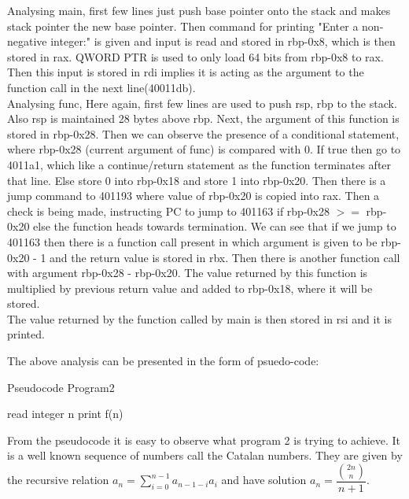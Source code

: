 \documentclass{article}
\begin{document}
Analysing main, first few lines just push base pointer onto the stack and makes stack pointer the new base pointer.
Then command for printing "Enter a non-negative integer:" is given and input is read and stored in rbp-0x8, which is then stored in rax. QWORD PTR is used to only load 64 bits from rbp-0x8 to rax. Then this input is stored in rdi implies it is acting as the argument to the function call in the next line(40011db). \\

Analysing func,
Here again, first few lines are used to push rsp, rbp to the stack. Also rsp is maintained 28 bytes above rbp. Next, the argument of this function is stored in rbp-0x28. Then we can observe the presence of a conditional statement, where rbp-0x28 (current argument of func) is compared with 0. If true then go to 4011a1, which like a continue/return statement as the function terminates after that line. Else store 0 into rbp-0x18 and store 1 into rbp-0x20. Then there is a jump command to 401193 where value of rbp-0x20 is copied into rax. Then a check is being made, instructing PC to jump to 401163 if rbp-0x28 $>=$ rbp-0x20 else the function heads towards termination. We can see that if we jump to 401163 then there is a function call present in which argument is given to be rbp-0x20 - 1 and the return value is stored in rbx. Then there is another function call with argument rbp-0x28 - rbp-0x20. The value returned by this function is multiplied by previous return value and added to rbp-0x18, where it will be stored. \\

The value returned by the function called by main is then stored in rsi and it is printed.

The above analysis can be presented in the form of psuedo-code:

\begin{algorithm}
  \caption{Pseudocode Program2}
  
  
  
  
  read integer n\;
  print f(n)\;
\end{algorithm}

From the pseudocode it is easy to observe what program 2 is trying to achieve. It is a well known sequence of numbers call the Catalan numbers. They are given by the recursive relation $a_n = \sum_{i=0}^{n-1}a_{n-1-i}a_{i} $ and have solution $a_n = \dfrac{{2n \choose n}}{n+1}$.


\end{document}
